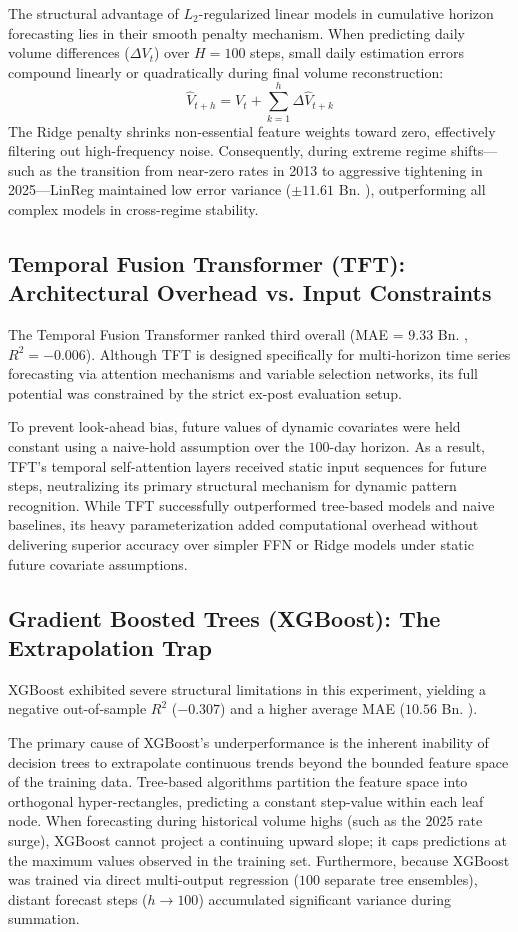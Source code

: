 The structural advantage of $L_2$-regularized linear models in cumulative horizon forecasting lies in their smooth penalty mechanism. When predicting daily volume differences ($\Delta V_t$) over $H = 100$ steps, small daily estimation errors compound linearly or quadratically during final volume reconstruction:
\begin{equation}
    \hat{V}_{t+h} = V_t + \sum_{k=1}^{h} \Delta \hat{V}_{t+k}
\end{equation}
The Ridge penalty shrinks non-essential feature weights toward zero, effectively filtering out high-frequency noise. Consequently, during extreme regime shifts—such as the transition from near-zero rates in 2013 to aggressive tightening in 2025—LinReg maintained low error variance ($\pm 11.61$ Bn. \texteuro), outperforming all complex models in cross-regime stability.

\subsection{Temporal Fusion Transformer (TFT): Architectural Overhead vs. Input Constraints}
The Temporal Fusion Transformer ranked third overall (MAE = $9.33$ Bn. \texteuro, $R^2 = -0.006$). Although TFT is designed specifically for multi-horizon time series forecasting via attention mechanisms and variable selection networks, its full potential was constrained by the strict ex-post evaluation setup.

To prevent look-ahead bias, future values of dynamic covariates were held constant using a naive-hold assumption over the $100$-day horizon. As a result, TFT’s temporal self-attention layers received static input sequences for future steps, neutralizing its primary structural mechanism for dynamic pattern recognition. While TFT successfully outperformed tree-based models and naive baselines, its heavy parameterization added computational overhead without delivering superior accuracy over simpler FFN or Ridge models under static future covariate assumptions.

\subsection{Gradient Boosted Trees (XGBoost): The Extrapolation Trap}
XGBoost exhibited severe structural limitations in this experiment, yielding a negative out-of-sample $R^2$ ($-0.307$) and a higher average MAE ($10.56$ Bn. \texteuro). 

The primary cause of XGBoost's underperformance is the inherent inability of decision trees to extrapolate continuous trends beyond the bounded feature space of the training data. Tree-based algorithms partition the feature space into orthogonal hyper-rectangles, predicting a constant step-value within each leaf node. When forecasting during historical volume highs (such as the $2025$ rate surge), XGBoost cannot project a continuing upward slope; it caps predictions at the maximum values observed in the training set. Furthermore, because XGBoost was trained via direct multi-output regression ($100$ separate tree ensembles), distant forecast steps ($h \to 100$) accumulated significant variance during summation.

